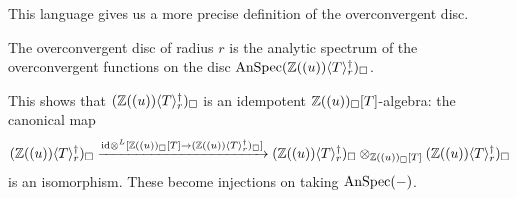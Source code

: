 This language gives us a more precise definition of the overconvergent disc. 
\begin{definition}\label{def: overconvergent disc}
    The overconvergent disc of radius $r$ is the analytic spectrum of the overconvergent functions on the disc $\mathrm{AnSpec}(\mathbb{Z}((u))\langle T\rangle_{r}^{\dagger})_{\square}$. 
\end{definition}
This shows that $(\mathbb{Z}((u))\langle T\rangle_{r}^{\dagger})_{\square}$ is an idempotent $\mathbb{Z}((u))_{\square}[T]$-algebra: the canonical map 
$$(\mathbb{Z}((u))\langle T\rangle_{r}^{\dagger})_{\square}\xrightarrow{\mathrm{id}\otimes^{L}[\mathbb{Z}((u))_{\square}[T]\to(\mathbb{Z}((u))\langle T\rangle_{r}^{\dagger})_{\square}]}(\mathbb{Z}((u))\langle T\rangle_{r}^{\dagger})_{\square}\otimes_{\mathbb{Z}((u))_{\square}[T]}(\mathbb{Z}((u))\langle T\rangle_{r}^{\dagger})_{\square}$$ 
is an isomorphism. These become injections on taking $\mathrm{AnSpec}(-)$. 

